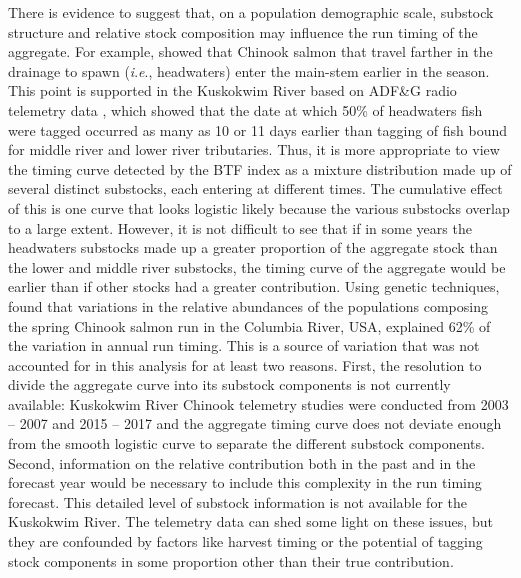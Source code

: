 \documentclass[12pt,]{book}
\theoremstyle{definition}
\theoremstyle{definition}
\theoremstyle{definition}
\theoremstyle{remark}
\begin{document}
There is evidence to suggest that, on a population demographic scale,
substock structure and relative stock composition may influence the run
timing of the aggregate. For example, \citet{clark-etal-2015} showed
that Chinook salmon that travel farther in the drainage to spawn
(\emph{i}.\emph{e}., headwaters) enter the main-stem earlier in the
season. This point is supported in the Kuskokwim River based on ADF\&G
radio telemetry data
\citep{smith-liller-2017a, smith-liller-2017b, stuby-2007}, which showed
that the date at which 50\% of headwaters fish were tagged occurred as
many as 10 or 11 days earlier than tagging of fish bound for middle
river and lower river tributaries. Thus, it is more appropriate to view
the timing curve detected by the BTF index as a mixture distribution
made up of several distinct substocks, each entering at different times.
The cumulative effect of this is one curve that looks logistic likely
because the various substocks overlap to a large extent. However, it is
not difficult to see that if in some years the headwaters substocks made
up a greater proportion of the aggregate stock than the lower and middle
river substocks, the timing curve of the aggregate would be earlier than
if other stocks had a greater contribution. Using genetic techniques,
\citet{anderson-beer-2009} found that variations in the relative
abundances of the populations composing the spring Chinook salmon run in
the Columbia River, USA, explained 62\% of the variation in annual run
timing. This is a source of variation that was not accounted for in this
analysis for at least two reasons. First, the resolution to divide the
aggregate curve into its substock components is not currently available:
Kuskokwim River Chinook telemetry studies were conducted from 2003 --
2007 and 2015 -- 2017 and the aggregate timing curve does not deviate
enough from the smooth logistic curve to separate the different substock
components. Second, information on the relative contribution both in the
past and in the forecast year would be necessary to include this
complexity in the run timing forecast. This detailed level of substock
information is not available for the Kuskokwim River. The telemetry data
can shed some light on these issues, but they are confounded by factors
like harvest timing \citep[some stocks may be harvested preferentially
purely due to the timing of the fishery, which does not mirror that of
the aggregate run;][]{hamazaki-2008} or the potential of tagging stock
components in some proportion other than their true contribution.
\end{document}
